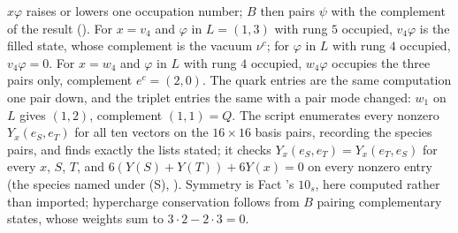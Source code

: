 $x\varphi$ raises or lowers one occupation number; $B$ then pairs $\psi$ with the complement of the result (). For $x = v_{4}$ and $\varphi$ in $L = (1,3)$ with rung $5$ occupied, $v_{4}\varphi$ is the filled state, whose complement is the vacuum $\nu^{c}$; for $\varphi$ in $L$ with rung $4$ occupied, $v_{4}\varphi = 0$. For $x = w_{4}$ and $\varphi$ in $L$ with rung $4$ occupied, $w_{4}\varphi$ occupies the three pairs only, complement $e^{c} = (2,0)$. The quark entries are the same computation one pair down, and the triplet entries the same with a pair mode changed: $w_{1}$ on $L$ gives $(1,2)$, complement $(1,1) = Q$. The script enumerates every nonzero $Y_{x}(e_{S}, e_{T})$ for all ten vectors on the $16 \times 16$ basis pairs, recording the species pairs, and finds exactly the lists stated; it checks $Y_{x}(e_{S}, e_{T}) = Y_{x}(e_{T}, e_{S})$ for every $x$, $S$, $T$, and $6(Y(S) + Y(T)) + 6Y(x) = 0$ on every nonzero entry (the species named under (S), ). Symmetry is Fact 's $10_{s}$, here computed rather than imported; hypercharge conservation follows from $B$ pairing complementary states, whose weights sum to $3 \cdot 2 - 2 \cdot 3 = 0$.
